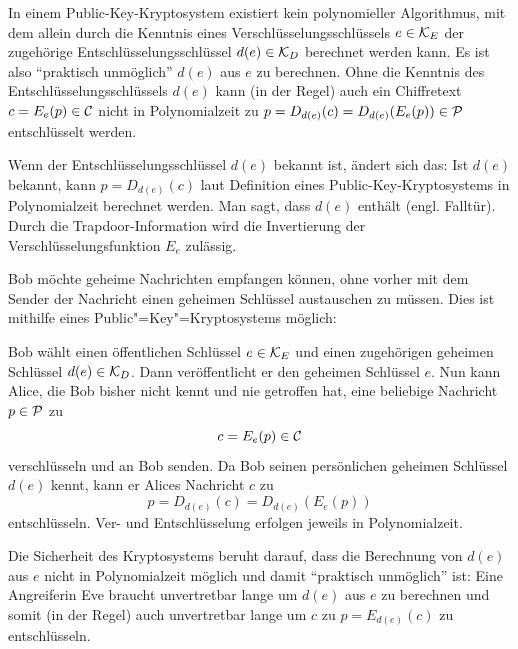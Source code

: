  \begin{remark}
 In einem Public-Key-Kryptosystem existiert kein polynomieller Algorithmus, mit dem allein durch die Kenntnis eines Verschlüsselungsschlüssels $e \in \mathcal K_E$ der zugehörige Entschlüsselungsschlüssel $d(e) \in \mathcal K_D$ berechnet werden kann. Es ist also \enquote{praktisch unmöglich} $d(e)$ aus $e$ zu berechnen. Ohne die Kenntnis des Entschlüsselungsschlüssels $d(e)$ kann (in der Regel) auch ein Chiffretext $c = E_e(p) \in \mathcal C$ nicht in Polynomialzeit zu $p = D_{d(e)}(c) = D_{d(e)}(E_e(p)) \in \mathcal P$ entschlüsselt werden. 
 
 Wenn der Entschlüsselungsschlüssel $d(e)$ bekannt ist, ändert sich das: Ist $d(e)$ bekannt, kann $p = D_{d(e)}(c)$ laut Definition eines Public-Key-Kryptosystems in Polynomialzeit berechnet werden. Man sagt, dass $d(e)$  enthält (engl. Falltür). Durch die Trapdoor-Information wird die Invertierung der Verschlüsselungsfunktion $E_e$ zulässig.
 \end{remark}


 
  \begin{construction}[Kommunikation mittels Public"=Key"=Kryptosystemen]
  Bob möchte geheime Nachrichten empfangen können, ohne vorher mit dem Sender der Nachricht einen geheimen Schlüssel austauschen zu müssen. Dies ist mithilfe eines Public"=Key"=Kryptosystems möglich:
  
  Bob wählt einen öffentlichen Schlüssel $e \in \mathcal K_E$ und einen zugehörigen geheimen Schlüssel $d(e) \in \mathcal K_D$. Dann veröffentlicht er den geheimen Schlüssel $e$. Nun kann Alice, die Bob bisher nicht kennt und nie getroffen hat, eine beliebige Nachricht $p \in \mathcal P$ zu
  \[c = E_e(p) \in \mathcal C\] verschlüsseln und an Bob senden. Da Bob seinen persönlichen geheimen Schlüssel $d(e)$ kennt, kann er Alices Nachricht $c$ zu \[p = D_{d(e)}(c) = D_{d(e)}(E_e(p))\] entschlüsseln. Ver- und Entschlüsselung erfolgen jeweils in Polynomialzeit.
  
  Die Sicherheit des Kryptosystems beruht darauf, dass die Berechnung von $d(e)$ aus $e$ nicht in Polynomialzeit möglich und damit \enquote{praktisch unmöglich} ist: Eine Angreiferin Eve braucht unvertretbar lange um $d(e)$ aus $e$ zu berechnen und somit (in der Regel) auch unvertretbar lange um $c$ zu $p = E_{d(e)}(c)$ zu entschlüsseln.
 \end{construction}
  
